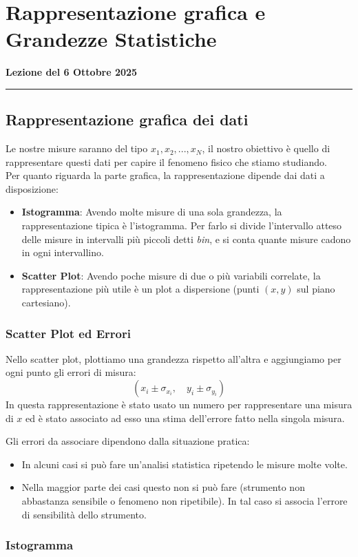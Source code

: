 \documentclass[openany,a4paper,12pt]{book}
\theoremstyle{remark}
\newcommand{\thelezione}{}
\newcommand{\lezione}[2]{
\newpage
\renewcommand{\thelezione}{#2} 
\section{#1} 
\noindent\textbf{\color{RoyalBlue}Lezione del #2}\par\vspace{0.5em}\hrule\vspace{1em}
}
\begin{document}
\lezione{Rappresentazione grafica e Grandezze Statistiche}{6 Ottobre 2025} 
\subsection*{Rappresentazione grafica dei dati}
Le nostre misure saranno del tipo ${x_1, x_2, ..., x_N}$, il nostro obiettivo è quello di rappresentare questi dati per capire il fenomeno fisico
che stiamo studiando.\\
Per quanto riguarda la parte grafica, la rappresentazione dipende dai dati a disposizione:
\begin{itemize}
    \item \textbf{Istogramma}: Avendo molte misure di una sola grandezza, la rappresentazione tipica è l'istogramma. Per farlo si divide l'intervallo atteso delle misure in intervalli più piccoli detti \textit{bin}, e si conta quante misure cadono in ogni intervallino.
    \item \textbf{Scatter Plot}: Avendo poche misure di due o più variabili correlate, la rappresentazione più utile è un plot a dispersione (punti $(x,y)$ sul piano cartesiano).
\end{itemize}

\subsubsection{Scatter Plot ed Errori}
Nello scatter plot, plottiamo una grandezza rispetto all'altra e aggiungiamo per ogni punto gli errori di misura:
\[ (x_i \pm \sigma_{x_i}, \quad y_i \pm \sigma_{y_i}) \]
In questa rappresentazione è stato usato un numero per rappresentare una misura di $x$ ed è stato associato ad esso una stima dell'errore fatto nella singola misura.

Gli errori da associare dipendono dalla situazione pratica:
\begin{itemize}
    \item In alcuni casi si può fare un'analisi statistica ripetendo le misure molte volte.
    \item Nella maggior parte dei casi  questo non si può fare (strumento non abbastanza sensibile o fenomeno non ripetibile). In tal caso si associa l'errore di sensibilità dello strumento.
\end{itemize}

\subsubsection{Istogramma}
\end{document}
